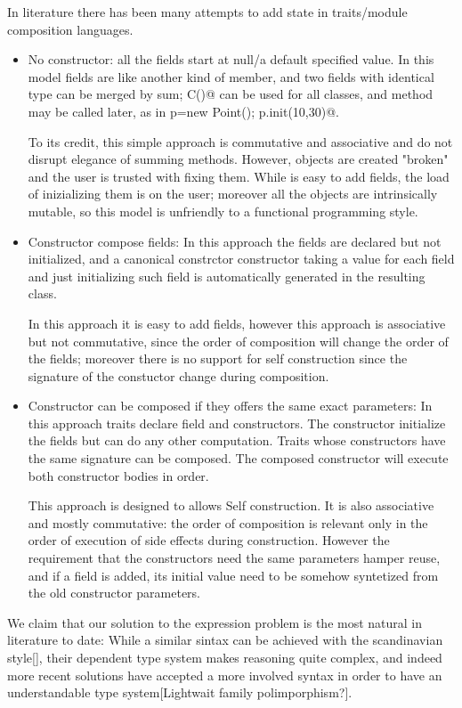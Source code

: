 In literature there has been many attempts to add state in traits/module composition languages.
\begin{itemize}  
\item No constructor: all the fields start at null/a default specified value.
  In this model fields are like another kind of member, and two fields
  with identical type can be merged by sum; \Q@new C()@ can be used for all classes, and \Q@init@ method may be called later, as in
  \Q@Point p=new Point(); p.init(10,30)@.
  
  To its credit, this simple approach is commutative and associative and do not disrupt elegance of summing methods.
  However, objects are created "broken" and the user is trusted with fixing them.
  While is easy to add fields, the load of inizializing them is on the user; moreover
    all the objects are intrinsically mutable, so this model is unfriendly
    to a functional programming style.
\item Constructor compose fields:
In this approach the fields are declared but not initialized, and
a canonical constrctor constructor taking a value for each field and just initializing such field
is automatically generated in the resulting class.

In this approach it is easy to add fields, however this approach is associative but not commutative, since the order of composition will change the order of the fields; moreover there is no support for self construction
since the signature of the constuctor change during composition.

\item Constructor can be composed if they offers the same exact parameters:
In this approach traits declare field and constructors.
The constructor initialize the fields but can do any other computation.
Traits whose constructors have the same signature can be composed.
The composed constructor will execute both constructor bodies in order.

This approach is designed to allows Self construction.
It is also associative and mostly commutative: the order of composition is relevant only
in the order of execution of side effects during construction.
However the requirement that the constructors need the same parameters 
hamper reuse, and if a field is added, its initial value need to be
somehow syntetized from the old constructor parameters.

\end{itemize}

We claim that our solution to the expression problem is the most natural in literature to date:
While a similar sintax can be achieved with the scandinavian style[], their dependent type system makes reasoning quite complex, and indeed more recent solutions have accepted a more involved syntax in order to have an understandable type system[Lightwait family polimporphism?].

